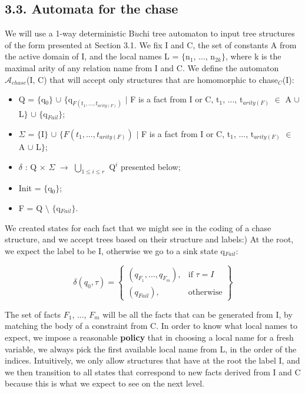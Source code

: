 \documentclass[11pt, a4paper, dvipsnames]{article}
\begin{document}
\subsection{3.3. Automata for the chase}
We will use a 1-way deterministic B$\ddot{u}$chi tree automaton to input tree structures of the form presented at Section 3.1. We fix I and C, the set of constants A from the active domain of I, and the local names L = $\{$n$_{1}$, ..., n$_{2k}\}$, where k is the maximal arity of any relation name from I and C. We define the automaton $\mathcal{A}_{chase}$(I, C) that will accept only structures that are homomorphic to chase$_{C}$(I):
\begin{itemize}
	\item Q = $\{$q$_{0}\}$ $\cup$ $\{$q$_{F(t_{1}, ..., t_{arity(F)})}$ $|$ F is a fact from I or C, t$_{1}$, ..., t$_{arity(F)}$ $\in$ A $\cup$ L$\}$ $\cup$ $\{$q$_{Fail}\}$;
	\item $\Sigma$ = $\{$I$\}$ $\cup$ $\{F(t_{1}, ..., t_{arity(F)})$ $|$ F is a fact from I or C, t$_{1}$, ..., t$_{arity(F)}$ $\in$ A $\cup$ L$\}$;
	\item $\delta$ : Q $\times$ $\Sigma$ $\rightarrow$ $\bigcup_{1 \leq i \leq r}$ Q$^{i}$ presented below;
	\item Init = $\{$q$_{0}\}$;
	\item F = Q $\setminus$ $\{$q$_{Fail}\}$.
\end{itemize}
We created states for each fact that we might see in the coding of a chase structure, and we accept trees based on their structure and labels:) At the root, we expect the label to be I, otherwise we go to a sink state q$_{Fail}$:
\begin{center}
\[\delta(q_{0},\tau) = \left\{\begin{array}{lr}
        (q_{F_{1}}, ..., q_{F_{m}}), & \text{if } \tau = I\\
        (q_{Fail}), & \text{otherwise} 
        \end{array}\right\}
  \] 
\end{center}
The set of facts $F_{1}$, ..., $F_{m}$ will be all the facts that can be generated from I, by matching the body of a constraint from C. In order to know what local names to expect, we impose a reasonable \textbf{policy} that in choosing a local name for a fresh variable, we always pick the first available local name from L, in the order of the indices. Intuitively, we only allow structures that have at the root the label I, and we then transition to all states that correspond to new facts derived from I and C because this is what we expect to see on the next level.\newline
\end{document}

